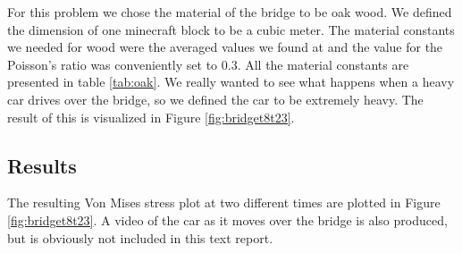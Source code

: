 For this problem we chose the material of the bridge to be oak wood. We defined the dimension of one minecraft block to be a cubic meter. The material constants we needed for wood were the averaged values we found at \cite{oak} and the value for the Poisson's ratio was conveniently set to 0.3. All the material constants are presented in table \ref{tab:oak}. We really wanted to see what happens when a heavy car drives over the bridge, so we defined the car to be extremely heavy. The result of this is visualized in Figure \ref{fig:bridget8t23}.

\subsection{Results}
The resulting Von Mises stress plot at two different times are plotted in Figure \ref{fig:bridget8t23}. A video of the car as it moves over the bridge is also produced, but is obviously not included in this text report.

